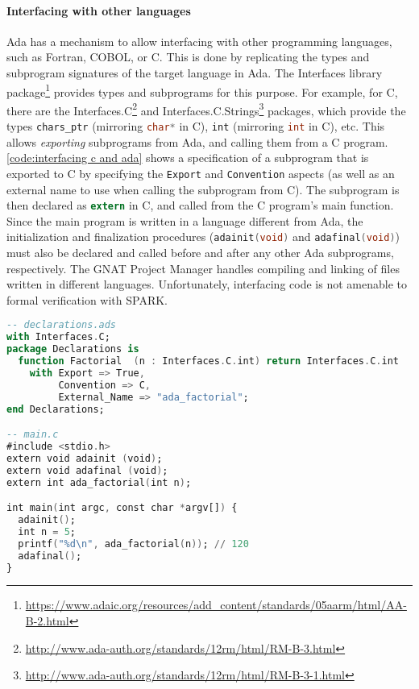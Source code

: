 \paragraph{Interfacing with other languages}
Ada has a mechanism to allow interfacing with other programming languages, such as Fortran, COBOL, or C.
This is done by replicating the types and subprogram signatures of the target language in Ada.
The Interfaces library package\footnote{\url{https://www.adaic.org/resources/add_content/standards/05aarm/html/AA-B-2.html}} provides types and subprograms for this purpose.
For example, for C, there are the Interfaces.C\footnote{\url{http://www.ada-auth.org/standards/12rm/html/RM-B-3.html}} and Interfaces.C.Strings\footnote{\url{http://www.ada-auth.org/standards/12rm/html/RM-B-3-1.html}} packages, which provide the types \lstinline[language=Ada]{chars_ptr} (mirroring \lstinline[language=C]{char*} in C), \lstinline[language=Ada]{int} (mirroring \lstinline[language=C]{int} in C), etc.
This allows \textit{exporting} subprograms from Ada, and calling them from a C program.
\autoref{code:interfacing c and ada} shows a specification of a subprogram that is exported to C by specifying the \lstinline[language=Ada]{Export} and \lstinline[language=Ada]{Convention} aspects (as well as an external name to use when calling the subprogram from C).
The subprogram is then declared as \lstinline[language=C]{extern} in C, and called from the C program's main function.
Since the main program is written in a language different from Ada, the initialization and finalization procedures (\lstinline[language=C]{adainit(void)} and \lstinline[language=C]{adafinal(void)}) must also be declared and called before and after any other Ada subprograms, respectively.
The GNAT Project Manager handles compiling and linking of files written in different languages.
Unfortunately, interfacing code is not amenable to formal verification with SPARK.

\begin{lstlisting}[float=tb,caption={Interfacing code written in C and Ada. \textnormal{declarations.adb} is omitted for brevity, but is assumed to contain an implementation of the factorial function conforming to the specification.}, label={code:interfacing c and ada}, language=Ada, alsolanguage=C]
-- declarations.ads
with Interfaces.C;
package Declarations is
  function Factorial  (n : Interfaces.C.int) return Interfaces.C.int
    with Export => True,
         Convention => C,
         External_Name => "ada_factorial";
end Declarations;

-- main.c
#include <stdio.h>
extern void adainit (void);
extern void adafinal (void);
extern int ada_factorial(int n);

int main(int argc, const char *argv[]) {
  adainit();
  int n = 5;
  printf("%d\n", ada_factorial(n)); // 120
  adafinal();
}
\end{lstlisting}

